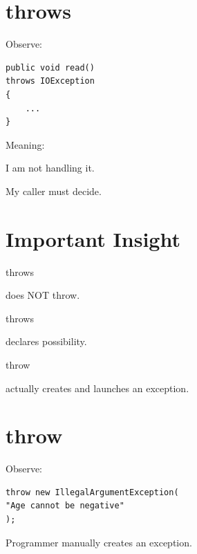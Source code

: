 \documentclass[11pt,a4paper]{book}
\begin{document}
\section{throws}

Observe:

\begin{verbatim} 
public void read()
throws IOException
{
    ...
}
\end{verbatim}


Meaning:


I am not handling it.


My caller must decide.


\section{Important Insight}

throws

does NOT throw.


throws

declares possibility.


throw

actually creates and launches
an exception.


\section{throw}

Observe:

\begin{verbatim} 
throw new IllegalArgumentException(
"Age cannot be negative"
);
\end{verbatim}


Programmer manually creates
an exception.

\end{document}
